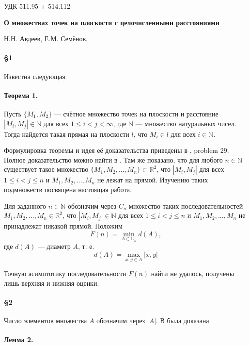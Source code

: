 \documentclass[a4paper,14pt]{article} %
\begin{document}
\large


УДК 511.95 + 514.112

\begin{center}
	\textbf{\LARGE О множествах точек на плоскости с целочисленными расстояниями}
\end{center}

{\Large{Н.Н. Авдеев, Е.М. Семёнов.}}


\paragraph{\S 1} %
Известна следующая

\paragraph{Теорема 1.} Пусть $\{M_1,M_2\}$ --- счётное множество точек на плоскости и расстояние $|M_i,M_j|\in \mathbb{N}$ для всех $1\leq i < j <\infty$, где $\mathbb{N}$ --- множество натуральных чисел. Тогда найдется такая прямая на плоскости $l$, что $M_i\in l$ для всех $i \in \mathbb{N}$.

Формулировка теоремы и идея её доказательства приведены в \cite{Newman}, problem 29. Полное доказательство можно найти в \cite{angem1kurs}.
Там же показано, что для любого $n\in \mathbb{N}$ существует такое множество $\{M_1,M_2,...,M_n\}\subset \mathbb{R}^2$, что $|M_i,M_j|$ для всех $1\leq i < j  \leq n$ и $M_1, M_2, ..., M_n$ не лежат на прямой.
Изучению таких подмножеств посвящена настоящая работа.


Для заданного $n\in \mathbb{N}$ обозначим через $C_n$ множество таких последовательностей $M_1,M_2,...,M_n \in \mathbb{R}^2$, что $|M_i,M_j|\in\mathbb{N}$ для всех $1\leq i < j  \leq n$ и  $M_1,M_2,...,M_n$ не принадлежат никакой прямой.
Положим
$$
F(n)=\min\limits_{A\in C_n} d(A),
$$
где $d(A)$ --- диаметр $A$, т. е.
$$
d(A)=\max\limits_{x,y\in A}|x,y|
$$

Точную асимптотику последовательности  $F(n)$ найти не удалось, получены лишь верхняя и нижняя оценки.

\paragraph{\S 2}
Число элементов множества $A$ обозначим через $|A|$.
В \cite{angem1kurs} была доказана

\paragraph{Лемма 2.}
\end{document}
